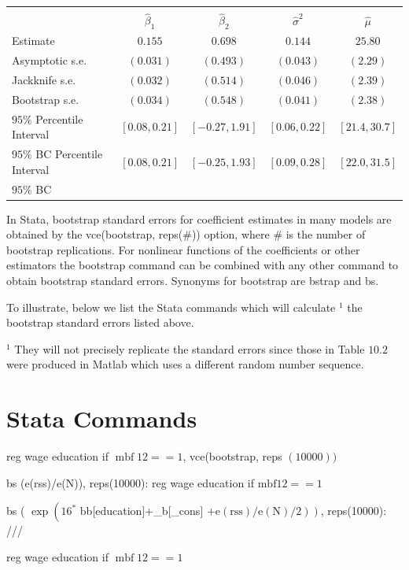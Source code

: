 \documentclass[10pt]{article}
\begin{document}
\begin{tabular}{lcccc}
\hline\hline
 &  &  &  &  \\
 & $\widehat{\beta}_{1}$ & $\widehat{\beta}_{2}$ & $\widehat{\sigma}^{2}$ & $\widehat{\mu}$ \\
\cline { 2 - 5 }
Estimate & $0.155$ & $0.698$ & $0.144$ & $25.80$ \\
Asymptotic s.e. & $(0.031)$ & $(0.493)$ & $(0.043)$ & $(2.29)$ \\
Jackknife s.e. & $(0.032)$ & $(0.514)$ & $(0.046)$ & $(2.39)$ \\
Bootstrap s.e. & $(0.034)$ & $(0.548)$ & $(0.041)$ & $(2.38)$ \\
$95 \%$ Percentile Interval & $[0.08,0.21]$ & $[-0.27,1.91]$ & $[0.06,0.22]$ & $[21.4,30.7]$ \\
$95 \%$ BC Percentile Interval & $[0.08,0.21]$ & $[-0.25,1.93]$ & $[0.09,0.28]$ & $[22.0,31.5]$ \\
$95 \%$ BC &  &  &  &  \\
\end{tabular}

In Stata, bootstrap standard errors for coefficient estimates in many models are obtained by the vce(bootstrap, reps(\#)) option, where \# is the number of bootstrap replications. For nonlinear functions of the coefficients or other estimators the bootstrap command can be combined with any other command to obtain bootstrap standard errors. Synonyms for bootstrap are bstrap and bs.

To illustrate, below we list the Stata commands which will calculate ${ }^{1}$ the bootstrap standard errors listed above.

${ }^{1}$ They will not precisely replicate the standard errors since those in Table $10.2$ were produced in Matlab which uses a different random number sequence.

\section{Stata Commands}
reg wage education if $\operatorname{mbf} 12==1$, vce(bootstrap, reps $(10000))$

bs (e(rss)/e(N)), reps(10000): reg wage education if $\mathrm{mbf} 12==1$

bs ( $\exp \left(16^{*}\right.$ bb[education]+\_b[\_cons] $\left.\left.+\mathrm{e}(\mathrm{rss}) / \mathrm{e}(\mathrm{N}) / 2\right)\right)$, reps(10000): ///

reg wage education if $\operatorname{mbf} 12==1$
\end{document}
